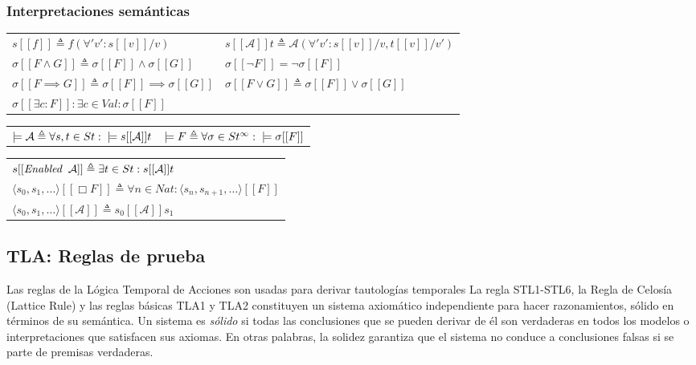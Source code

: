 \subsubsection{Interpretaciones semánticas}
\begin{tabular}{ll}
    $s[[f]] \triangleq f(\forall 'v' : s[[v]] / v)$ & $s[[\mathcal{A}]]t \triangleq \mathcal{A}(\forall 'v' : s[[v]] / v, t[[v]] / v')$\\
    $\sigma[[F \land G]] \triangleq \sigma[[F]] \land \sigma[[G]]$ & $\sigma[[\neg F]] = \neg \sigma [[F]]$\\
    $\sigma[[F \implies G]] \triangleq \sigma[[F]] \implies \sigma[[G]]$ & $\sigma[[F \lor G]] \triangleq \sigma[[F]] \lor \sigma[[G]]$\\
    $\sigma[[\exists c : F]] : \exists c \in Val : \sigma[[F]]$ &\\  
\end{tabular}

\vspace{0.2cm}
\begin{tabular}{ll}
    $\models \mathcal{A} \triangleq \forall s,t \in St : \hspace{0.2cm} \models s[[\mathcal{A}]]t$ & $\models F \triangleq \forall \sigma \in St^\infty : \hspace{0.2cm} \models \sigma[[F]]$\\
\end{tabular}

\vspace{0.2cm}
\begin{tabular}{l}
    $s[[\textit{Enabled} \hspace{0.2cm} \mathcal{A}]] \triangleq \exists t \in St : s[[\mathcal{A}]]t$ \\
    $\langle s_0, s_1, \ldots\rangle[[\Box F]] \triangleq \forall n \in Nat : \langle s_n, s_{n+1}, \ldots\rangle[[F]]$ \\
    $\langle s_0, s_1, \ldots\rangle[[\mathcal{A}]] \triangleq s_0[[\mathcal{A}]]s_1$\\
\end{tabular}

\subsection{TLA: Reglas de prueba}
Las reglas de la Lógica Temporal de Acciones son usadas para derivar tautologías temporales La regla STL1-STL6, la Regla de Celosía (Lattice Rule) y las reglas básicas TLA1 y TLA2 constituyen un sistema axiomático independiente para hacer razonamientos, sólido en términos de su semántica. Un sistema es \textit{sólido} si todas las conclusiones que se pueden derivar de él son verdaderas en todos los modelos o interpretaciones que satisfacen sus axiomas. En otras palabras, la solidez garantiza que el sistema no conduce a conclusiones falsas si se parte de premisas verdaderas.

